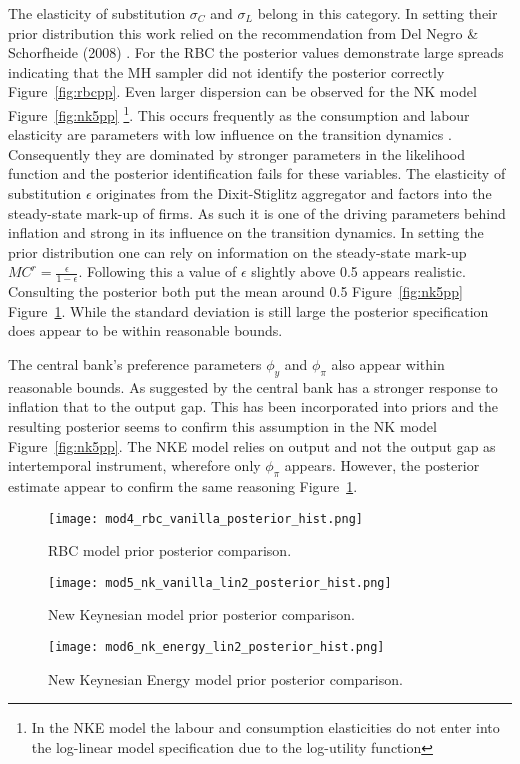 \documentclass[12pt,a4paper,english]{article} %
\begin{document}
	The elasticity of substitution $\sigma_C$ and $\sigma_L$ belong in this category. In setting their prior distribution this work relied on the recommendation from Del Negro \& Schorfheide (2008) \cite{del_negro_forming_2008}. For the RBC the posterior values demonstrate large spreads indicating that the MH sampler did not identify the posterior correctly Figure~\ref{fig:rbcpp}. Even larger dispersion can be observed for the NK model Figure~\ref{fig:nk5pp} \footnote{In the \ac{NKE} model the labour and consumption elasticities do not enter into the log-linear model specification due to the log-utility function}. This occurs frequently as the consumption and labour elasticity are parameters with low influence on the transition dynamics \cite{guerron-quintana_bayesian_2013}. Consequently they are dominated by stronger parameters in the likelihood function and the posterior identification fails for these variables.
	The elasticity of substitution $\epsilon$ originates from the Dixit-Stiglitz aggregator and factors into the steady-state mark-up of firms. As such it is one of the driving parameters behind inflation and strong in its influence on the transition dynamics. In setting the prior distribution one can rely on information on the steady-state mark-up $MC^r = \frac{\epsilon}{1-\epsilon}$. Following this a value of $\epsilon$ slightly above 0.5 appears realistic. Consulting the posterior both put the mean around 0.5 Figure~\ref{fig:nk5pp} Figure~\ref{fig:nk6pp}. While the standard deviation is still large the posterior specification does appear to be within reasonable bounds. 
	
	The central bank's preference parameters $\phi_y$ and $\phi_{\pi}$ also appear within reasonable bounds. As suggested by \cite{gali_monetary_2008} the central bank has a stronger response to inflation that to the output gap. This has been incorporated into priors and the resulting posterior seems to confirm this assumption in the NK model Figure~\ref{fig:nk5pp}. The NKE model relies on output and not the output gap as intertemporal instrument, wherefore only $\phi_{\pi}$ appears. However, the posterior estimate appear to confirm the same reasoning Figure~\ref{fig:nk6pp}.
	\begin{figure}[H]
		\begin{center}
			\texttt{[image: mod4\_rbc\_vanilla\_posterior\_hist.png]}
			\caption{RBC model prior posterior comparison.}\label{fig:rbcpp}
			\texttt{[image: mod5\_nk\_vanilla\_lin2\_posterior\_hist.png]}
			\caption{New Keynesian model prior posterior comparison.}\label{fig:nk5pp}
			\texttt{[image: mod6\_nk\_energy\_lin2\_posterior\_hist.png]}
			\caption{New Keynesian Energy model prior posterior comparison.}\label{fig:nk6pp}
		\end{center}
	\end{figure}
	\pagebreak
		
\end{document}
